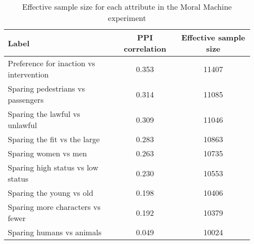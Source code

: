 \begin{table}
\caption{Effective sample size for each attribute in the Moral Machine experiment}
\label{tab:n0MME}
\begin{tabular}{lcc}
\toprule
Label & PPI correlation & Effective sample size \\
\midrule
Preference for inaction vs intervention & 0.353 & 11407 \\
Sparing pedestrians vs passengers & 0.314 & 11085 \\
Sparing the lawful vs unlawful & 0.309 & 11046 \\
Sparing the fit vs the large & 0.283 & 10863 \\
Sparing women vs men & 0.263 & 10735 \\
Sparing high status vs low status & 0.230 & 10553 \\
Sparing the young vs old & 0.198 & 10406 \\
Sparing more characters vs fewer & 0.192 & 10379 \\
Sparing humans vs animals & 0.049 & 10024 \\
\bottomrule
\end{tabular}
\end{table}
